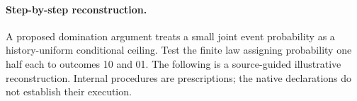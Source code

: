 %
%
%
\paragraph{Step-by-step reconstruction.}
A proposed domination argument treats a small joint event probability as a history-uniform conditional ceiling. Test the finite law assigning probability one half each to outcomes 10 and 01.
The following is a source-guided illustrative reconstruction. Internal procedures are prescriptions; the native declarations do not establish their execution.
